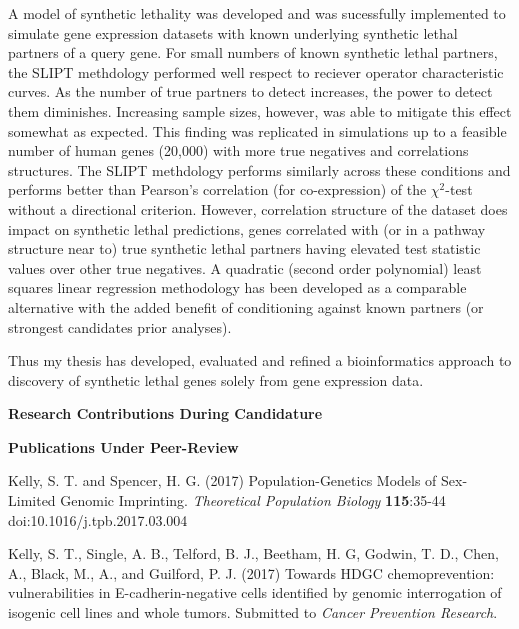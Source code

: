 A model of synthetic lethality was developed and was sucessfully implemented to simulate gene expression datasets with known underlying synthetic lethal partners of a query gene. For small numbers of known synthetic lethal partners, the SLIPT methdology performed well respect to reciever operator characteristic curves. As the number of true partners to detect increases, the power to detect them diminishes. Increasing sample sizes, however, was able to mitigate this effect somewhat as expected. This finding was replicated in simulations up to a feasible number of human genes (20,000) with more true negatives and correlations structures. The SLIPT methdology performs similarly across these conditions and performs better than Pearson's correlation (for co-expression) of the $\chi^2$-test without a directional criterion.  However, correlation structure of the dataset does impact on synthetic lethal predictions, genes correlated with (or in a pathway structure near to) true synthetic lethal partners having elevated test statistic values over other true negatives. A quadratic (second order polynomial) least squares linear regression methodology has been developed as a comparable alternative with the added benefit of conditioning against known partners (or strongest candidates prior analyses).


Thus my thesis has developed, evaluated and refined a bioinformatics approach to discovery of synthetic lethal genes solely from gene expression data.  

\clearpage

\begin{center}
 \textbf{Research Contributions During Candidature}
\end{center}

\textbf{Publications Under Peer-Review}

 
Kelly, S. T. and Spencer, H. G. (2017) Population-Genetics Models of Sex-Limited Genomic Imprinting. \textit{Theoretical Population Biology} \textbf{115}:35-44 doi:10.1016/j.tpb.2017.03.004

Kelly, S. T., Single, A. B., Telford, B. J., Beetham, H. G, Godwin, T. D., Chen, A., Black, M., A., and Guilford, P. J. (2017) Towards HDGC chemoprevention: vulnerabilities in E-cadherin-negative cells identified by genomic interrogation of isogenic cell lines and whole tumors.  Submitted to \textit{Cancer Prevention Research}.

